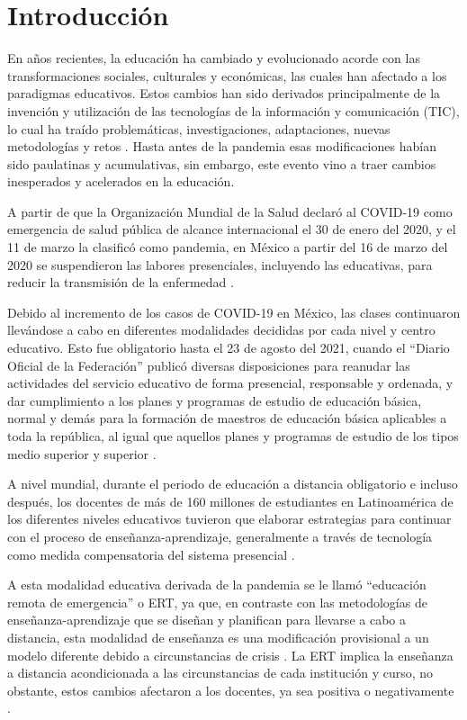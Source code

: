\documentclass[spanish]{textolivre}
\begin{document}
\section{Introducción}\label{sec-intro}
En años recientes, la educación ha cambiado y evolucionado acorde con las transformaciones sociales, culturales y económicas, las cuales han afectado a los paradigmas educativos. Estos cambios han sido derivados principalmente de la invención y utilización de las tecnologías de la información y comunicación (TIC), lo cual ha traído problemáticas, investigaciones, adaptaciones, nuevas metodologías y retos \cite{tejadafernandez2000docente}. Hasta antes de la pandemia esas modificaciones habían sido paulatinas y acumulativas, sin embargo, este evento vino a traer cambios inesperados y acelerados en la educación.

A partir de que la Organización Mundial de la Salud declaró al COVID-19 como emergencia de salud pública de alcance internacional el 30 de enero del 2020, y el 11 de marzo la clasificó como pandemia, \cite{escudero_pandemia_nodate} en México a partir del 16 de marzo del 2020 se suspendieron las labores presenciales, incluyendo las educativas, para reducir la transmisión de la enfermedad \cite{secretariaacuerdo20}.

Debido al incremento de los casos de COVID-19 en México, las clases continuaron llevándose a cabo en diferentes modalidades decididas por cada nivel y centro educativo. Esto fue obligatorio hasta el 23 de agosto del 2021, cuando el “Diario Oficial de la Federación” publicó diversas disposiciones para reanudar las actividades del servicio educativo de forma presencial, responsable y ordenada, y dar cumplimiento a los planes y programas de estudio de educación básica, normal y demás para la formación de maestros de educación básica aplicables a toda la república, al igual que aquellos planes y programas de estudio de los tipos medio superior y superior \cite{secretariaacuerdo21}.

A nivel mundial, durante el periodo de educación a distancia obligatorio e incluso después, los docentes de más de 160 millones de estudiantes en Latinoamérica \cite{unesco} de los diferentes niveles educativos tuvieron que elaborar estrategias para continuar con el proceso de enseñanza-aprendizaje, generalmente a través de tecnología como medida compensatoria del sistema presencial \cite{almazan2020covid}.

A esta modalidad educativa derivada de la pandemia se le llamó “educación remota de emergencia” o ERT, ya que, en contraste con las metodologías de enseñanza-aprendizaje que se diseñan y planifican para llevarse a cabo a distancia, esta modalidad de enseñanza es una modificación provisional a un modelo diferente debido a circunstancias de crisis \cite{hodges2020difference}. La ERT implica la enseñanza a distancia acondicionada a las circunstancias de cada institución y curso, no obstante, estos cambios afectaron a los docentes, ya sea positiva o negativamente \cite{rocha_estrada_docentes_2022}. 
\end{document}
